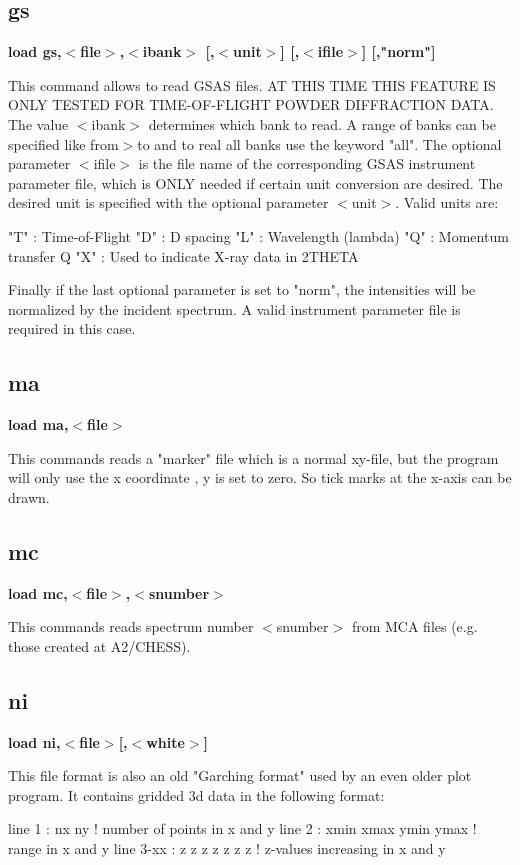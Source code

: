 \subsection*{gs}
{\bf load gs,$ <$file$> $,$ <$ibank$> $ [,$ <$unit$> $] [,$ <$ifile$> $] [,"norm"] \par }
\par
\vspace{3pt}
This command allows to read GSAS files. AT THIS TIME THIS FEATURE 
IS ONLY TESTED FOR TIME-OF-FLIGHT POWDER DIFFRACTION DATA. The value 
$ <$ibank$> $ determines which bank to read. A range of banks can be 
specified like from$> $to and to real all banks use the keyword "all". 
The optional parameter $ <$ifile$> $ is the file name of the corresponding 
GSAS instrument parameter file, which is ONLY needed if certain unit 
conversion are desired. The desired unit is specified with the optional 
parameter $ <$unit$> $. Valid units are: 
\par
\begin{MacVerbatim}
   "T"    : Time-of-Flight
   "D"    : D spacing
   "L"    : Wavelength (lambda)
   "Q"    : Momentum transfer Q
   "X"    : Used to indicate X-ray data in 2THETA
\end{MacVerbatim}
Finally if the last optional parameter is set to "norm", the intensities 
will be normalized by the incident spectrum. A valid instrument parameter 
file is required in this case. 
\subsection*{ma}
{\bf load ma,$ <$file$> $ \par }
\par
\vspace{3pt}
This commands reads a "marker" file which is a normal xy-file, but 
the program will only use the x coordinate , y is set to zero. So 
tick marks at the x-axis can be drawn. 
\subsection*{mc}
{\bf load mc,$ <$file$> $,$ <$snumber$> $ \par }
\par
\vspace{3pt}
This commands reads spectrum number $ <$snumber$> $ from MCA files 
(e.g. those created at A2/CHESS). 
\subsection*{ni}
{\bf load ni,$ <$file$> $[,$ <$white$> $] \par }
\par
\vspace{3pt}
This file format is also an old "Garching format" used by an even 
older plot program. It contains gridded 3d data in the following 
format: 
\par
\begin{MacVerbatim}
line 1    : nx ny                    ! number of points in x and y
line 2    : xmin xmax ymin ymax      ! range in x and y
line 3-xx : z z z z z z z            ! z-values increasing in x and y
\end{MacVerbatim}
